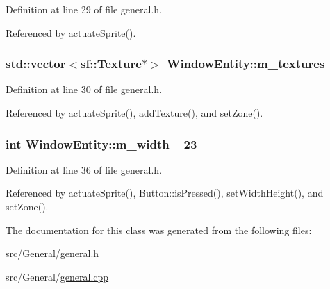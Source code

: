 Definition at line 29 of file general.\-h.



Referenced by actuate\-Sprite().

\hypertarget{class_window_entity_a253dbb3c77532a8a737f4cee7e7c5c81}{
\subsubsection[{m\-\_\-textures}]{\setlength{\rightskip}{0pt plus 5cm}std\-::vector$<$sf\-::\-Texture$\ast$$>$ Window\-Entity\-::m\-\_\-textures\hspace{0.3cm}{\ttfamily [protected]}}}\label{class_window_entity_a253dbb3c77532a8a737f4cee7e7c5c81}


Definition at line 30 of file general.\-h.



Referenced by actuate\-Sprite(), add\-Texture(), and set\-Zone().

\hypertarget{class_window_entity_a9e7b56b5f91e5dd19b7c7a9d7bc587bf}{
\subsubsection[{m\-\_\-width}]{\setlength{\rightskip}{0pt plus 5cm}int Window\-Entity\-::m\-\_\-width =23\hspace{0.3cm}{\ttfamily [protected]}}}\label{class_window_entity_a9e7b56b5f91e5dd19b7c7a9d7bc587bf}


Definition at line 36 of file general.\-h.



Referenced by actuate\-Sprite(), Button\-::is\-Pressed(), set\-Width\-Height(), and set\-Zone().



The documentation for this class was generated from the following files\-:\begin{DoxyCompactItemize}
\item 
src/\-General/\hyperlink{general_8h}{general.\-h}\item 
src/\-General/\hyperlink{general_8cpp}{general.\-cpp}\end{DoxyCompactItemize}
